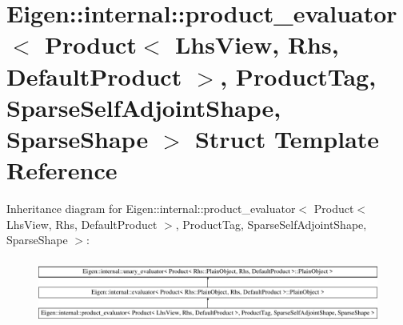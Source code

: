 \hypertarget{struct_eigen_1_1internal_1_1product__evaluator_3_01_product_3_01_lhs_view_00_01_rhs_00_01_defaul9695c5493cd4054bc6e3c91568225f16}{}\section{Eigen\+::internal\+::product\+\_\+evaluator$<$ Product$<$ Lhs\+View, Rhs, Default\+Product $>$, Product\+Tag, Sparse\+Self\+Adjoint\+Shape, Sparse\+Shape $>$ Struct Template Reference}
\label{struct_eigen_1_1internal_1_1product__evaluator_3_01_product_3_01_lhs_view_00_01_rhs_00_01_defaul9695c5493cd4054bc6e3c91568225f16}
Inheritance diagram for Eigen\+::internal\+::product\+\_\+evaluator$<$ Product$<$ Lhs\+View, Rhs, Default\+Product $>$, Product\+Tag, Sparse\+Self\+Adjoint\+Shape, Sparse\+Shape $>$\+:\begin{figure}[H]
\begin{center}
\leavevmode
\includegraphics[height=2.162162cm]{struct_eigen_1_1internal_1_1product__evaluator_3_01_product_3_01_lhs_view_00_01_rhs_00_01_defaul9695c5493cd4054bc6e3c91568225f16}
\end{center}
\end{figure}
